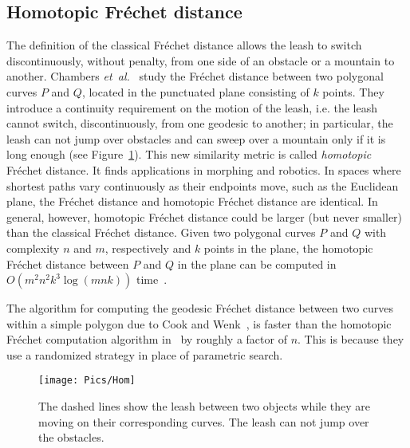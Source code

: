 \documentclass[12pt]{dalthesis}
\newcommand{\etal}{{\em et~al.\/}}
\newcommand{\Frechet}{Fr\'echet }
\begin{document}
\subsection{Homotopic \Frechet distance}


The definition of the classical \Frechet distance allows the leash to switch discontinuously, 
without penalty, from one side of an obstacle or a mountain to another.
Chambers  \etal~\cite{Chambers10} study the \Frechet distance between two 
polygonal curves $P$ and $Q$, located in the punctuated plane  consisting of  
$k$ points. They introduce a continuity requirement on the motion of the leash, i.e. the leash cannot switch, discontinuously, from one geodesic to another; in particular, the leash can not jump over obstacles  and can sweep over a mountain only if it is long enough
(see Figure~\ref{fig:Hom}).
This new similarity metric is called {\em homotopic} \Frechet distance.
It finds applications in morphing and robotics.
In spaces where shortest paths vary continuously
as their endpoints move, such as the Euclidean plane, the
\Frechet distance and homotopic \Frechet distance are
identical. In general, however, homotopic \Frechet distance
could be larger (but never smaller) than the classical
\Frechet distance.
Given two polygonal curves $P$ and $Q$ with complexity $n$ and $m$, respectively 
and $k$ points in the plane,
the homotopic \Frechet distance between $P$ and $Q$ in the plane can be computed
in $O(m^2n^2 k^3 \log(m n k))$ time~\cite{Chambers10}.



The algorithm for computing the geodesic \Frechet distance between two curves within a simple
polygon due to Cook and Wenk~\cite{WenkC08a}, is faster than the homotopic \Frechet computation algorithm in~\cite{Chambers10} by roughly a factor of $n$. This is because they use a randomized strategy in place of parametric search. 








\begin{figure}[t]
	\centering
	\texttt{[image: Pics/Hom]}
	\caption{The dashed lines show the leash between two objects 
	while they are moving on their corresponding curves. 
	The leash can not jump over the obstacles.}
	\label{fig:Hom}
\end{figure}
\end{document}
